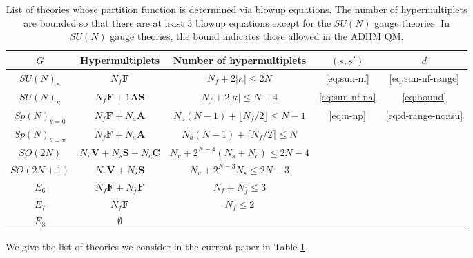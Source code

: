 \documentclass[letterpaper, 11pt]{article}
\begin{document}
{\begin{table}[t!]
  \centering
  \begin{tabular}{|c|c|c|c|c|}
    \hline
    $G$ & Hypermultiplets & Number of hypermultiplets &   $(s, s')$ & $d$ \\
    \hline \hline
    $SU(N)_\kappa$ & $N_f \boldsymbol{F}$ & $N_f+2|\kappa|\leq 2N$ &    \eqref{eq:sun-nf} & \eqref{eq:sun-nf-range} \\
    \cline{1-5}
    $SU(N)_\kappa$ & $N_f \boldsymbol{F}+1\textbf{AS}$ & $N_f+2|\kappa|\leq N+4$ &    \eqref{eq:sun-nf-na} & \eqref{eq:bound} \\
    \cline{1-5}
    $Sp(N)_{\theta=0}$ & $N_f\boldsymbol{F}+N_a\boldsymbol{A}$ & $N_a(N-1)+\lfloor N_f/2\rfloor\leq N-1$ &   \multirow{7}{*}{\eqref{eq:n-np}}& \multirow{7}{*}{\eqref{eq:d-range-nonsu}} \\
    \cline{1-3}
    $Sp(N)_{\theta=\pi}$ & $N_f\boldsymbol{F}+N_a\boldsymbol{A}$ & $N_a(N-1)+\lceil N_f/2\rceil\leq N$ & & \\
    $SO(2N)$ & $N_v\boldsymbol{V}+N_s\boldsymbol{S}+N_c\boldsymbol{C}$ & $N_v+2^{N-4}(N_s+N_c)\leq 2N-4$ &  & \\
    \cline{1-3}
    $SO(2N+1)$ & $N_v\boldsymbol{V}+N_s\boldsymbol{S}$ & $N_v+2^{N-3}N_s\leq2 N-3$ & &   \\
    \cline{1-3}
    $E_6$ & $N_f\boldsymbol{F}+N_{\bar{f}}\boldsymbol{\bar{F}}$ & $N_f+N_{\bar{f}}\leq3 $ & &   \\
    \cline{1-3}
    $E_7$ & $N_f\boldsymbol{F}$ & $N_f\leq2$ & &   \\
    \cline{1-3}
    $E_8$ & $\emptyset$ &  & &   \\
    \hline
    \end{tabular}
    \caption{List of theories whose partition function is determined via blowup equations. The number of hypermultiplets are bounded so that there are at least 3 blowup equations except for the $SU(N)$ gauge theories. In $SU(N)$ gauge theories, the bound indicates those allowed in the ADHM QM.}
    \label{tbl:list}
\end{table}
We give the list of theories we consider in the current paper in Table \ref{tbl:list}. 

}
\end{document}
